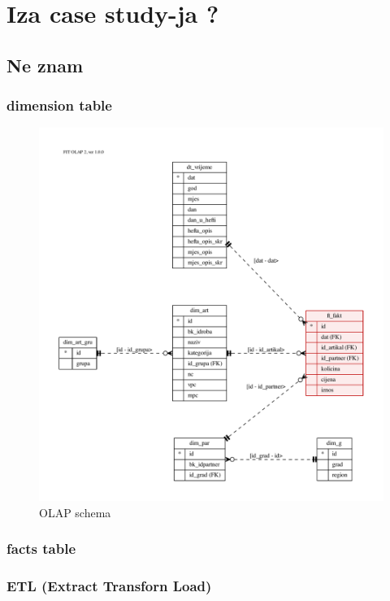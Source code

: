 \documentclass[times, utf8, seminar]{fit}
\begin{document}
\chapter{Iza case study-ja ?}

\section{Ne znam}

\subsection{dimension table}

\begin{figure}[h]
\centering
\includegraphics[width=15cm]{img/F18_olap.pdf}
\caption{OLAP schema}
\end{figure}



\subsection{facts table}



\subsection{ETL (Extract Transforn Load)}
\end{document}
